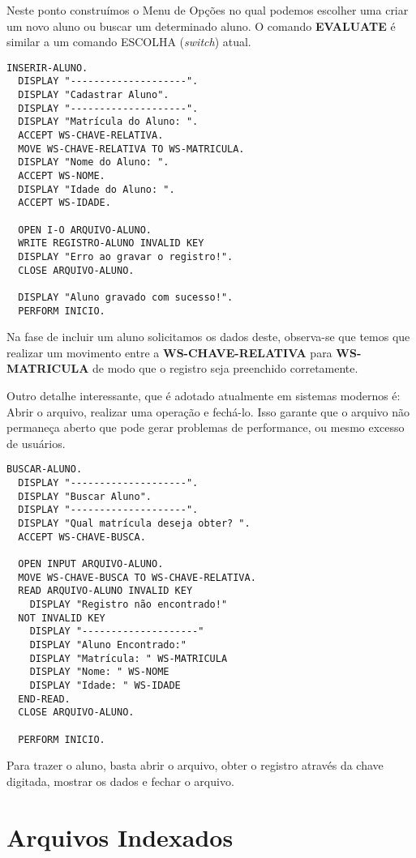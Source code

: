 Neste ponto construímos o Menu de Opções no qual podemos escolher uma criar um novo aluno ou buscar um determinado aluno. O comando \textbf{EVALUATE} é similar a um comando ESCOLHA (\textit{switch}) atual.

\begin{lstlisting}[]
INSERIR-ALUNO.
  DISPLAY "--------------------".
  DISPLAY "Cadastrar Aluno".
  DISPLAY "--------------------".
  DISPLAY "Matrícula do Aluno: ".
  ACCEPT WS-CHAVE-RELATIVA.
  MOVE WS-CHAVE-RELATIVA TO WS-MATRICULA.
  DISPLAY "Nome do Aluno: ".
  ACCEPT WS-NOME.
  DISPLAY "Idade do Aluno: ".
  ACCEPT WS-IDADE.

  OPEN I-O ARQUIVO-ALUNO.
  WRITE REGISTRO-ALUNO INVALID KEY
  DISPLAY "Erro ao gravar o registro!".
  CLOSE ARQUIVO-ALUNO.

  DISPLAY "Aluno gravado com sucesso!".
  PERFORM INICIO.	
\end{lstlisting}

Na fase de incluir um aluno solicitamos os dados deste, observa-se que temos que realizar um movimento entre a \textbf{WS-CHAVE-RELATIVA} para \textbf{WS-MATRICULA} de modo que o registro seja preenchido corretamente.

Outro detalhe interessante, que é adotado atualmente em sistemas modernos é: Abrir o arquivo, realizar uma operação e fechá-lo. Isso garante que o arquivo não permaneça aberto que pode gerar problemas de performance, ou mesmo excesso de usuários.

\begin{lstlisting}[]
BUSCAR-ALUNO.
  DISPLAY "--------------------".
  DISPLAY "Buscar Aluno".
  DISPLAY "--------------------".
  DISPLAY "Qual matrícula deseja obter? ".
  ACCEPT WS-CHAVE-BUSCA.

  OPEN INPUT ARQUIVO-ALUNO.
  MOVE WS-CHAVE-BUSCA TO WS-CHAVE-RELATIVA.
  READ ARQUIVO-ALUNO INVALID KEY
    DISPLAY "Registro não encontrado!"
  NOT INVALID KEY
    DISPLAY "--------------------"
    DISPLAY "Aluno Encontrado:"
    DISPLAY "Matrícula: " WS-MATRICULA
    DISPLAY "Nome: " WS-NOME
    DISPLAY "Idade: " WS-IDADE
  END-READ.
  CLOSE ARQUIVO-ALUNO.

  PERFORM INICIO.	
\end{lstlisting}

Para trazer o aluno, basta abrir o arquivo, obter o registro através da chave digitada, mostrar os dados e fechar o arquivo.

\section{Arquivos Indexados}

